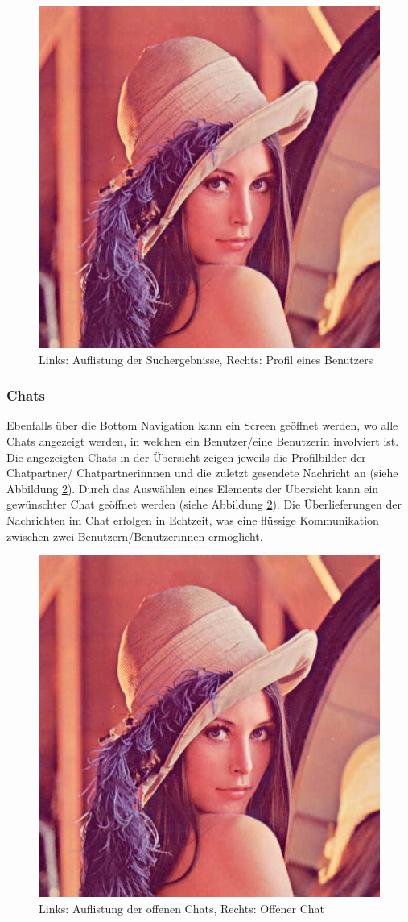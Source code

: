 \documentclass[../main.tex]{subfiles}
\begin{document}
\begin{figure} 
	\centering
	\includegraphics[width=0.45\textwidth*2, height=0.45\textwidth/9*16]{./images/lena.jpg}
	\caption{Links: Auflistung der Suchergebnisse, Rechts: Profil eines Benutzers}
	\label{results_profile}
\end{figure}

\subsubsection*{Chats}
Ebenfalls über die Bottom Navigation kann ein Screen geöffnet werden, wo alle Chats angezeigt werden, in welchen ein Benutzer/eine Benutzerin involviert ist. Die angezeigten Chats in der Übersicht zeigen jeweils die Profilbilder der Chatpartner/ Chatpartnerinnnen und die zuletzt gesendete Nachricht an (siehe Abbildung \ref{chat}). Durch das Auswählen eines Elements der Übersicht kann ein gewünschter Chat geöffnet werden (siehe Abbildung \ref{chat}). Die Überlieferungen der Nachrichten im Chat erfolgen in Echtzeit, was eine flüssige Kommunikation zwischen zwei Benutzern/Benutzerinnen ermöglicht.

\begin{figure} 
	\centering
	\includegraphics[width=0.45\textwidth*2, height=0.45\textwidth/9*16]{./images/lena.jpg}
	\caption{Links: Auflistung der offenen Chats, Rechts: Offener Chat}
	\label{chat}
\end{figure}
\end{document}
